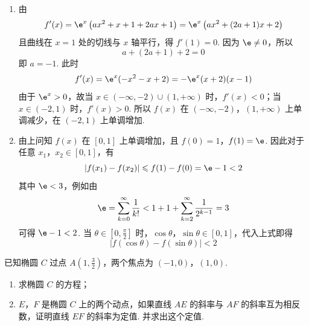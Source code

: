 \begin{solution}
\begin{enumerate}
\item 由
\[
f'(x)=\e^{x}\left(ax^{2}+x+1+2ax+1\right)
    =\e^{x}\left(ax^{2}+(2a+1)x+2\right)
\]
且曲线在 \(x=1\) 处的切线与 \(x\) 轴平行，得 \(f'(1)=0\). 因为 \(\e\neq0\)，所以
\[
a+(2a+1)+2=0
\]
即 \(a=-1\). 此时
\[
f'(x)=\e^{x}(-x^{2}-x+2)=-\e^{x}(x+2)(x-1)
\]
由于 \(\e^{x}>0\)，故当 \(x\in(-\infty,-2)\cup(1,+\infty)\) 时，\(f'(x)<0\)；当 \(x\in(-2,1)\) 时，\(f'(x)>0\). 所以 \(f(x)\) 在 \((-\infty,-2)\)，\((1,+\infty)\) 上单调减少，在 \((-2,1)\) 上单调增加.
\item 由上问知 \(f(x)\) 在 \([0,1]\) 上单调增加，且 \(f(0)=1\)，\(f(1)=\e\).
因此对于任意 \(x_{1}\)，\(x_{2}\in[0,1]\)，有
\[
\left|f(x_{1})-f(x_{2})\right|\leqslant f(1)-f(0)=\e-1<2
\]
其中 \(\e<3\)，例如由
\[
\e=\sum_{k=0}^{\infty}\frac{1}{k!}<1+1+\sum_{k=2}^{\infty}\frac{1}{2^{k-1}}=3
\]
可得 \(\e-1<2\).
当 \(\theta\in\left[0,\frac{\pi}{2}\right]\) 时，\(\cos\theta\)，\(\sin\theta\in[0,1]\)，代入上式即得
\[
\left|f(\cos\theta)-f(\sin\theta)\right|<2
\]
\end{enumerate}
\end{solution}

\begin{problem}
已知椭圆 \(C\) 过点 \(A\left(1, \frac{3}{2}\right)\)，两个焦点为 \((-1, 0)\)，\((1, 0)\).
\begin{enumerate}
\item 求椭圆 \(C\) 的方程；
\item \(E\)，\(F\) 是椭圆 \(C\) 上的两个动点，如果直线 \(AE\) 的斜率与 \(AF\) 的斜率互为相反数，证明直线 \(EF\) 的斜率为定值. 并求出这个定值.
\end{enumerate}
\end{problem}

